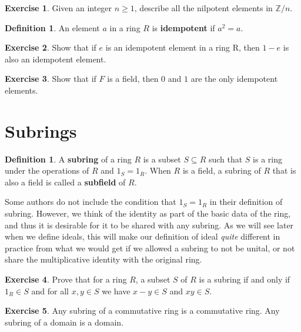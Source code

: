 \documentclass[12pt]{report}
\numberwithin{equation}{section}
\numberwithin{theorem}{chapter}
\theoremstyle{definition}
\newtheorem{definition}[theorem]{Definition}
\newtheorem{exercise}{Exercise}
\newtheorem*{basic properties}{Basic Properties}
\newtheorem*{Important Remark}{Important Remark}
\newcommand{\df}[1]{{\bf #1}\index{#1}}
\begin{document}
\begin{exercise}
	Given an integer $n \geqslant 1$, describe all the nilpotent elements in $\mathbb{Z}/n$.
\end{exercise}




\begin{definition}
An element $a$ in a ring $R$ is {\bf idempotent} if $a^2 = a$.
\end{definition}


\begin{exercise}
Show that if $e$ is an idempotent element in a ring R, then $1-e$ is also an idempotent element.
\end{exercise}

\begin{exercise}
	Show that if $F$ is a field, then $0$ and $1$ are the only idempotent elements.
\end{exercise}



\section{Subrings}


\begin{definition}\label{def:subring} 
A \df{subring} of a ring $R$ is a subset $S \subseteq R$ such that $S$ is a ring under the operations of $R$ and $1_S = 1_R$.
When $R$ is a field, a subring of $R$ that is also a field is called a \df{subfield} of $R$.
\end{definition}


Some authors do not include the condition that $1_S = 1_R$ in their definition of subring. However, we think of the identity as part of the basic data of the ring, and thus it is desirable for it to be shared with any subring. As we will see later when we define ideals, this will make our definition of ideal \emph{quite} different in practice from what we would get if we allowed a subring to not be unital, or not share the multiplicative identity with the original ring.

\begin{exercise}\label{subring test}
Prove that for a ring $R$, a subset $S$ of $R$ is a subring if and only if
  $1_R \in S$ and for all $x,y \in S$ we have $x-y \in S$ and $xy \in S$.
\end{exercise}




\begin{exercise}\label{subring commutative ring}
 Any subring of a commutative ring is a commutative ring. Any subring of a domain is  a domain.
 \end{exercise}
\end{document}
